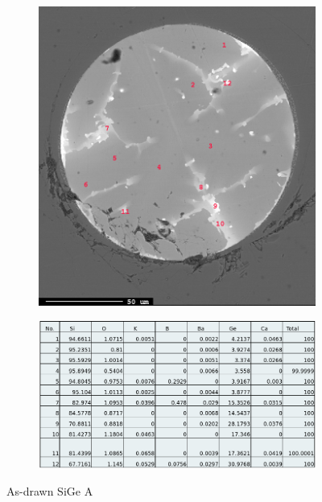 \begin{figure}[h]
\centering
\begin{subfigure}{.6\textwidth}
  \centering
  \includegraphics[width=\linewidth]{fig/EDS/db30618-8_point.png}
  \label{fig:sfig1}
\end{subfigure}%

\begin{subfigure}{\textwidth}
  \centering
  \includegraphics[width=\linewidth]{fig/EDS/db30618_point.png}
  \label{fig:sfig2}
\end{subfigure}%

\caption{As-drawn SiGe A}
\label{sige_contrast}
\end{figure}

